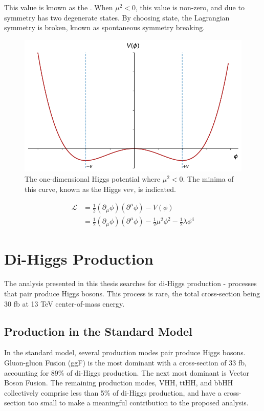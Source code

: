 This value is known as the . When $\mu^2 < 0$, this value is non-zero, and due to symmetry has two degenerate states. By choosing state, the Lagrangian symmetry is broken, known as spontaneous symmetry breaking.

\begin{figure}[!ht]
    \centering
    \includegraphics[width=\textwidth]{chapters/chapter1_theory/images/higgs-2d-vev.png}
    \caption{The one-dimensional Higgs potential where $\mu^2 <0$. The minima of this curve, known as the Higgs \gls{vev}, is indicated.}
    \label{fig:higgs-potential}
\end{figure}


\begin{equation} \label{higgs-lagrangian}
    \begin{aligned}
        \mathcal{L} &= \frac{1}{2}(\partial_{\mu}\phi)(\partial^{\mu}\phi) - V(\phi)\\
        &= \frac{1}{2}(\partial_{\mu}\phi)(\partial^{\mu}\phi) - \frac{1}{2}\mu^2\phi^2 - \frac{1}{2}\lambda\phi^4
    \end{aligned}
\end{equation}



\section{Di-Higgs Production}


The analysis presented in this thesis searches for di-Higgs production - processes that pair produce Higgs bosons.   This process is rare, the total cross-section being {\color{red} 30} fb at 13 TeV center-of-mass energy.

\subsection{Production in the Standard Model}
In the standard model, several production modes pair produce Higgs bosons. Gluon-gluon Fusion (ggF) is the most dominant with a cross-section of {\color{red} 33} fb, accounting for {\color{red} 89\%} of di-Higgs production. The next most dominant is Vector Boson Fusion. The remaining production modes, VHH, ttHH, and bbHH collectively comprise less than 5\% of di-Higgs production, and have a cross-section too small to make a meaningful contribution to the proposed analysis.

